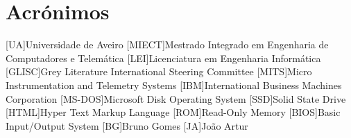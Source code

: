 \documentclass{report}
\begin{document}
\chapter*{Acrónimos}
\begin{acronym}
[UA]{Universidade de Aveiro}
[MIECT]{Mestrado Integrado em Engenharia de Computadores e Telemática}
[LEI]{Licenciatura em Engenharia Informática}
[GLISC]{Grey Literature International Steering Committee}
[MITS]{Micro Instrumentation and Telemetry Systems}
[IBM]{International Business Machines Corporation}
[MS-DOS]{Microsoft Disk Operating System}
[SSD]{Solid State Drive}
[HTML]{Hyper Text Markup Language}
[ROM]{Read-Only Memory}
[BIOS]{Basic Input/Output System}
[BG]{Bruno Gomes}
[JA]{João Artur}
\end{acronym}


\printbibliography
\end{document}
